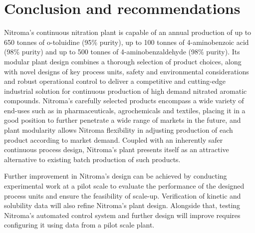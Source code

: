 \section*{Conclusion and recommendations}
Nitroma's continuous nitration plant is capable of an annual production of up to 650 tonnes of o-toluidine (95\% purity), up to 100 tonnes of 4-aminobenzoic acid (98\% purity) and up to 500 tonnes of 4-aminobenzaldehyde (98\% purity). Its modular plant design combines a thorough selection of product choices, along with novel designs of key process units, safety and environmental considerations and robust operational control to deliver a competitive and cutting-edge industrial solution for continuous production of high demand nitrated aromatic compounds. Nitroma's carefully selected products encompass a wide variety of end-uses such as in pharmaceuticals, agrochemicals and textiles, placing it in a good position to further penetrate a wide range of markets in the future, and plant modularity allows Nitroma flexibility in adjusting production of each product according to market demand. Coupled with an inherently safer continuous process design, Nitroma's plant presents itself as an attractive alternative to existing batch production of such products.

Further improvement in Nitroma's design can be achieved by conducting experimental work at a pilot scale to evaluate the performance of the designed process units and ensure the feasibility of scale-up. Verification of kinetic and solubility data will also refine Nitroma's plant design. Alongside that, testing Nitroma's automated control system and further design will improve requires configuring it using data from a pilot scale plant. 

